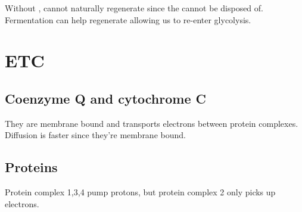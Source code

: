 \documentclass[12pt]{article}
\begin{document}
Without ,  cannot naturally regenerate 
since the  cannot be disposed of. 
Fermentation can help regenerate  allowing us to 
re-enter glycolysis. 

\section{ETC}

\subsection{Coenzyme Q and cytochrome C}
They are membrane bound and transports electrons between protein
complexes. Diffusion is faster since they're membrane bound. 

\subsection{Proteins}
Protein complex 1,3,4 pump protons, but protein complex 2 only
picks up electrons.
\end{document}
